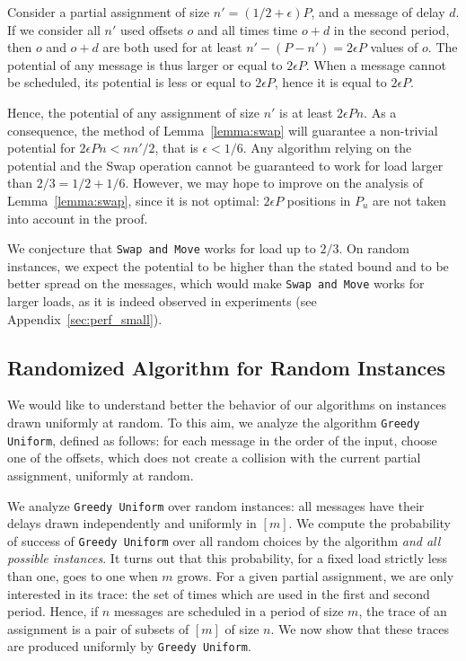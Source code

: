 \documentclass[a4paper,cleveref, autoref, thm-restate,UKenglish]{lipics-v2019}
\newcommand\greedyuniform{\texttt{Greedy Uniform}\xspace}
\newcommand\swapandmove{\texttt{Swap and Move}\xspace}
\begin{document}
Consider a partial assignment of size $n' = (1/2 + \epsilon)P$, and a message of delay $d$.
If we consider all $n'$ used offsets $o$ and all times time $o+d$ in the second period, 
then $o$ and $o+d$ are both used for at least $n' - (P -n') = 2\epsilon P$ values of $o$.
The potential of any message is thus larger or equal to $2\epsilon P$. When a message cannot be scheduled, its potential is less or equal to $2\epsilon P$, hence it is equal to $2\epsilon P$.

Hence, the potential of any assignment of size $n'$ is at least $2\epsilon P n $. As a consequence, the method of Lemma~\ref{lemma:swap} will guarantee a non-trivial potential for $2\epsilon P n <  nn'/2$, that is $\epsilon < 1/6$. Any algorithm relying on the potential and the Swap operation cannot be guaranteed to work for load larger than $2/3 = 1/2 + 1/6$. However, we may hope to improve on the analysis of Lemma~\ref{lemma:swap}, since it is not optimal: $2\epsilon P$ positions in $P_{u}$ are not taken into account in the proof. 

We conjecture that \swapandmove works for load up to $2/3$. 
On random instances, we expect the potential to be higher than the stated bound and to be better spread on the messages, which would make \swapandmove works for larger loads, as it is indeed observed in experiments (see Appendix~\ref{sec:perf_small}).

\subsection{Randomized Algorithm for Random Instances}

We would like to understand better the behavior of our algorithms
on instances drawn uniformly at random. To this aim, we analyze the algorithm \greedyuniform, defined as follows: for each message in the order of the input, choose one of the offsets, which does not create a collision with the current partial assignment, uniformly at random. 

We analyze \greedyuniform over random instances:  all messages have 
their delays drawn independently and uniformly in $[m]$. We compute the probability of success of \greedyuniform over all random choices by the algorithm \emph{and all possible instances}. 
It turns out that this probability, for a fixed load strictly less than one, goes to one when $m$ grows. 
For a given partial assignment, we are only interested in its trace: the set of times which are used in the first and second period. Hence, if $n$ messages are scheduled in a period of size $m$, the trace of an assignment is a pair of subsets of $[m]$ of size $n$. We now show that these traces are produced uniformly by \greedyuniform.
\end{document}
